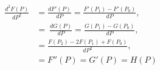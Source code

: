 \begin{align} \frac{d^2F(P)}{dP^2} & = \frac{dF'(P)}{dP}=\frac{F'(P_1)-F'(P_0)}{dP}, \\[10pt] & =\ \frac{dG(P)}{dP}=\frac{G(P_1)-G(P_0)}{dP}, \\[10pt] & =\frac{F(P_2)-2F(P_1)+F(P_0)}{dP^2}, \\[10pt] & =F''(P)=G'(P)=H(P) \end{align}
